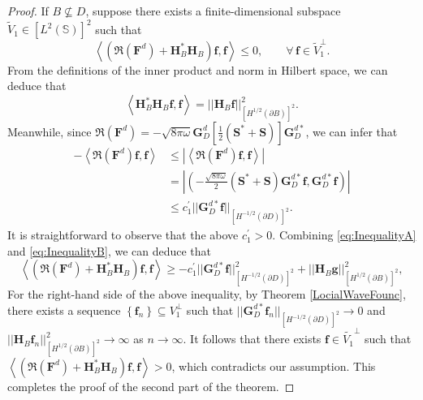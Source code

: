\documentclass[11pt,reqno,twoside]{amsart}
\theoremstyle{definition}
\theoremstyle{remark}
\numberwithin{equation}{section}
\begin{document}
\begin{proof}
	If $B\nsubseteq D$, suppose there exists a finite-dimensional subspace $\tilde{V}_1\in \left[L^{2}\left(\mathbb S \right) \right]^2$ such that
	$$
		\left\langle \left( \Re\left( \mathbf F^d\right)+\mathbf H^*_B\mathbf H_B\right) \mathbf f, \mathbf f\right\rangle \leq 0, \qquad \forall \,\mathbf f \in \tilde{V}_1^\perp.
	$$
	From the definitions of the inner product and norm in Hilbert space, we can deduce that
	\begin{equation}\label{eq:InequalityA}
		\left\langle \mathbf H^*_B\mathbf H_B \mathbf f ,\mathbf f\right\rangle =||\mathbf H_B \mathbf f||^2_{\left[H^{1/2}\left(\partial B \right) \right]^2}.
	\end{equation}
Meanwhile, since $\Re\left( \mathbf F^d\right) = -\sqrt{8\pi\omega}\mathbf G_D^d \left[ \frac{1}{2}\left( \mathbf S^* + \mathbf S\right) \right] \mathbf G_D^{d*}$, we can infer that
\begin{equation}\begin{aligned}\label{eq:InequalityB}
-\left\langle \Re\left( \mathbf F^d\right) \mathbf f, \mathbf f\right\rangle
&\leq |\left\langle \Re\left( \mathbf F^d\right) \mathbf f, \mathbf f\right\rangle| \\
&= \left| \left( -\frac{\sqrt{8\pi\omega}}{2} \left( \mathbf S^*+\mathbf S\right) \mathbf G_D^{d*} \mathbf f, \mathbf G_D^{d*} \mathbf f \right) \right| \\
&\leq c_1^{'}||\mathbf G_D^{d*} \mathbf f||_{\left[H^{-1/2}\left(\partial D \right) \right]^2}.
\end{aligned}\end{equation}
It is straightforward to observe that the above $c_1^{'} > 0 $. Combining \eqref{eq:InequalityA} and \eqref{eq:InequalityB}, we can deduce that
	$$
	\left\langle \left( \Re\left( \mathbf F^d\right)+\mathbf H^*_B\mathbf H_B\right) \mathbf f, \mathbf f\right\rangle \geq - c_1^{'}||\mathbf G_D^{d*} \mathbf f||^2_{\left[H^{-1/2}\left(\partial D \right) \right]^2} + ||\mathbf H_B \mathbf g||^2_{\left[H^{1/2}\left(\partial B \right) \right]^2},
	$$
	For the right-hand side of the above inequality, by Theorem \ref{LocialWaveFounc}, there exists a sequence $\left\lbrace \mathbf f_n \right\rbrace \subseteq V_1^\perp$ such that $||\mathbf G_D^{d*} \mathbf f_n||_{\left[H^{-1/2}\left(\partial D \right) \right]^2} \to 0$ and $||\mathbf H_B \mathbf f_n||^2_{\left[H^{1/2}\left(\partial B \right) \right]^2} \to \infty$ as $n\to \infty$. It follows that there exists $\mathbf f \in \tilde{V_1}^\perp $ such that $ \left\langle \left( \Re\left( \mathbf F^d\right)+\mathbf H^*_B\mathbf H_B\right) \mathbf f, \mathbf f\right\rangle > 0$, which contradicts our assumption. This completes the proof of the second part of the theorem.
\end{proof}
\end{document}
